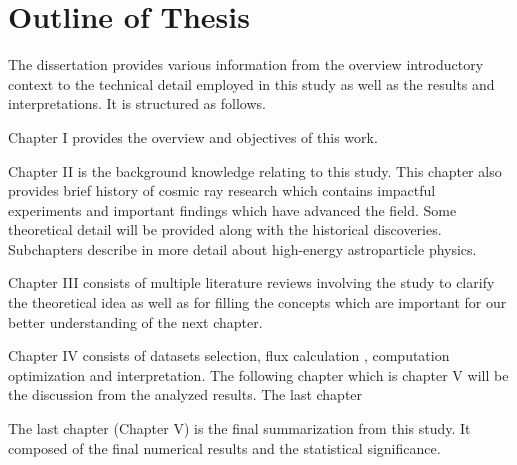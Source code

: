 \section{Outline of Thesis}
The dissertation provides various information from the
overview introductory context to the technical detail employed
in this study as well as the results and interpretations. It is 
structured as follows.

Chapter I provides the overview and objectives of this work.

Chapter II is the background knowledge relating to this 
study. This chapter also provides brief history of cosmic ray 
research which contains impactful experiments and important
findings which have advanced the field.
Some theoretical detail will be provided along with the historical
discoveries. Subchapters describe in more detail about high-energy
astroparticle physics.

Chapter III consists of multiple literature reviews involving
the study to clarify the theoretical idea as well as for filling the
concepts which are important for our better understanding of the next chapter.



Chapter IV consists of datasets selection, flux calculation
, computation optimization and interpretation. The following chapter which is chapter V will be the discussion from the analyzed results.
The last chapter 

The last chapter (Chapter V) is the final summarization from this study.
It composed of the final numerical results and the statistical significance.
